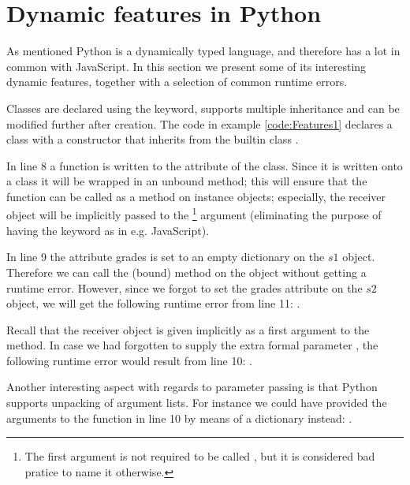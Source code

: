 \chapter{Dynamic features in Python}
As mentioned Python is a dynamically typed language, and therefore has a lot in common with JavaScript. In this section we present some of its interesting dynamic features, together with a selection of common runtime errors.

Classes are declared using the  keyword, supports multiple inheritance and can be modified further after creation. 
The code in example \ref{code:Features1} declares a class  with a constructor that inherits from the builtin class .

In line 8 a function  is written to the  attribute of the  class. Since it is written onto a class it will be wrapped in an unbound method; this will ensure that the function can be called as a method on instance objects; especially, the receiver object will be implicitly passed to the \footnote{The first argument is not required to be called , but it is considered bad pratice to name it otherwise.} argument (eliminating the purpose of having the  keyword as in e.g. JavaScript).

In line 9 the attribute grades is set to an empty dictionary on the $s1$ object. Therefore we can call the (bound) method  on the  object without getting a runtime error. However, since we forgot to set the grades attribute on the $s2$ object, we will get the following runtime error from line 11: . 

Recall that the receiver object is given implicitly as a first argument to the  method. 
In case we had forgotten to supply the extra formal parameter , the following runtime error would result from line 10:
. 

Another interesting aspect with regards to parameter passing is that Python supports unpacking of argument lists. For instance we could have provided the arguments to the  function in line 10 by means of a dictionary instead: 
.

